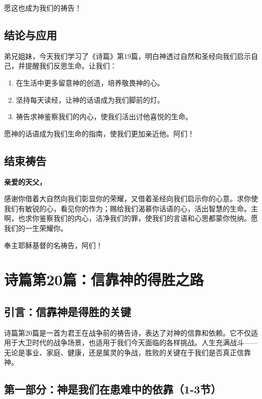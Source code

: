 \documentclass[a4paper, 12pt]{article}
\begin{document}
愿这也成为我们的祷告！

\subsection*{结论与应用}

弟兄姐妹，今天我们学习了《诗篇》第19篇，明白神透过自然和圣经向我们启示自己，并提醒我们反思生命。让我们：

\begin{enumerate}
    \item 在生活中更多留意神的创造，培养敬畏神的心。
    \item 坚持每天读经，让神的话语成为我们脚前的灯。
    \item 祷告求神鉴察我们的内心，使我们活出讨他喜悦的生命。
\end{enumerate}

愿神的话语成为我们生命的指南，使我们更加亲近他。阿们！

\subsection*{结束祷告}
\textbf{亲爱的天父，}

感谢你借着大自然向我们彰显你的荣耀，又借着圣经向我们启示你的心意。求你使我们有敏锐的心，看见你的作为；赐给我们渴慕你话语的心，活出智慧的生命。主啊，也求你鉴察我们的内心，洁净我们的罪，使我们的言语和心思都蒙你悦纳。愿我们的一生荣耀你。

奉主耶稣基督的名祷告，阿们！

\newpage
\section{诗篇第20篇：信靠神的得胜之路}

\subsection*{引言：信靠神是得胜的关键}

诗篇第20篇是一首为君王在战争前的祷告诗，表达了对神的信靠和依赖。它不仅适用于大卫时代的战争场景，也适用于我们今天面临的各样挑战。人生充满战斗——无论是事业、家庭、健康，还是属灵的争战，胜败的关键在于我们是否真正信靠神。

\subsection*{第一部分：神是我们在患难中的依靠（1-3节）}
\end{document}
